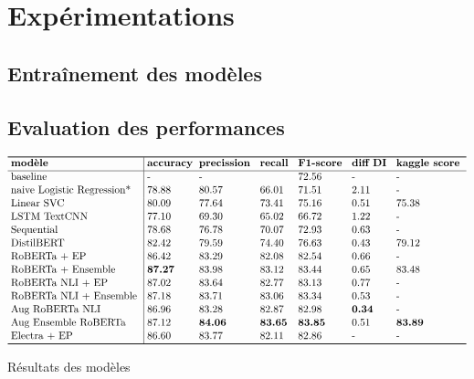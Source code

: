 \chapter{Expérimentations}

\section{Entraînement des modèles}
\label{sec:sample-section}

\section{Evaluation des performances}

\begin{table}[ht!]
    $$\vbox{
    \offinterlineskip
    \halign{
    \strut
    \vrule height1ex depth1ex width0px #
    &\kern3pt #\hfil\kern3pt\vrule
    &\kern3pt #\hfil\kern3pt
    &\kern3pt #\hfil\kern3pt
    &\kern3pt #\hfil\kern3pt
    &\kern3pt #\hfil\kern3pt
    &\kern3pt #\hfil\kern3pt
    &\kern3pt #\hfil\kern3pt
    \cr
    \noalign{\hrule height0.8pt}
     & \textbf{modèle}                      & \textbf{accuracy}& \textbf{precission} & \textbf{recall} & \textbf{F1-score} & \textbf{diff DI} & \textbf{kaggle score}                  \cr
    \noalign{\hrule}
     & baseline                   & -        & -          &        & 72.56    & -       & -                             \cr
     & naive Logistic Regression* & 78.88    & 80.57      & 66.01  & 71.51    & 2.11    & -                             \cr
     & Linear SVC                 & 80.09    & 77.64      & 73.41  & 75.16    & 0.51    & 75.38                         \cr
     & LSTM TextCNN               & 77.10    & 69.30      & 65.02  & 66.72    & 1.22    & -                             \cr
     & Sequential                 & 78.68    & 76.78      & 70.07  & 72.93    & 0.63    & -                             \cr
     & DistilBERT                 & 82.42    & 79.59      & 74.40  & 76.63    & 0.43    & 79.12                         \cr
     & RoBERTa + EP               & 86.42    & 83.29      & 82.08  & 82.54    & 0.66    & -                             \cr
     & RoBERTa + Ensemble         & \textbf{87.27} & 83.98      & 83.12  & 83.44    & 0.65    & 83.48                         \cr
     & RoBERTa NLI + EP           & 87.02    & 83.64      & 82.77  & 83.13    & 0.77    & -                             \cr
     & RoBERTa NLI + Ensemble     & 87.18    & 83.71      & 83.06  & 83.34    & 0.53    & -                             \cr
     & Aug RoBERTa NLI            & 86.96    & 83.28      & 82.87  & 82.98    & \textbf{0.34} & -                             \cr
     & Aug Ensemble RoBERTa       & 87.12    & \textbf{84.06} & \textbf{83.65} & \textbf{83.85} & 0.51  & \textbf{83.89}        \cr
     & Electra + EP               & 86.60    & 83.77      & 82.11  & 82.86    & -       & -                            \cr
    \noalign{\hrule height0.8pt}
    }
    }$$
    \caption{Résultats des modèles}
    \label{table:1}
    \end{table}


